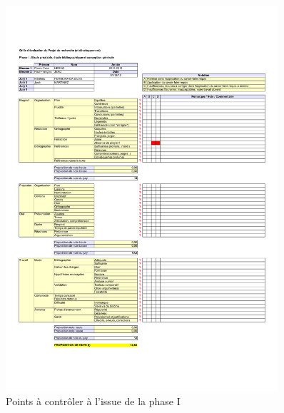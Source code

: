 \documentclass[11pt, french]{report-rd-info}
\begin{document}
\begin{figure}
         \includegraphics[width=0.9\textwidth]{Images/Grille-Evaluation-PRD1}
      \fi
	\caption{Points à contrôler à l'issue de la phase I}
	\label{fig:AutoEvaluationTravailIntermediaire}
\end{figure}
\end{document}
